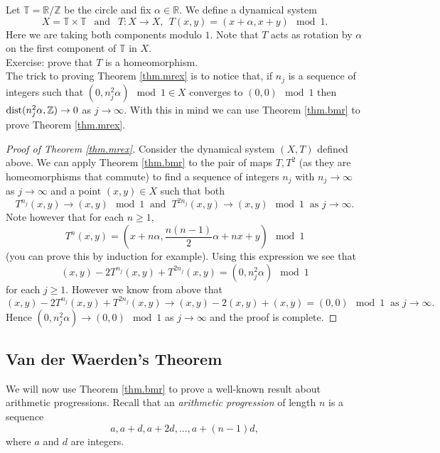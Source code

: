 \documentclass[12pt]{article}
\theoremstyle{definition}
\theoremstyle{remark}
\begin{document}
Let $\mathbb T = \mathbb R/ \mathbb Z$ be the circle and fix $\alpha \in \mathbb{R}$. We define a dynamical system
\[
X = \mathbb T \times \mathbb T \ \ \text{ and } \ \ T: X \to X, \ \ T(x,y) = (x + \alpha, x + y) \mod 1.
\]
Here we are taking both components modulo $1$. Note that $T$ acts as rotation by $\alpha$ on the first component of $\mathbb T$ in $X$. \\

Exercise: prove that $T$ is a homeomorphism.\\

The trick to proving Theorem \ref{thm.mrex} is to notice that, if $n_j$ is a sequence of integers such that $(0,n_j^2\alpha) \mod 1 \in X$ converges to $(0,0) \mod 1$  then $\textnormal{dist}(n_j^2\alpha, \mathbb{Z}) \to 0 $ as $j \to\infty$. With this in mind we can use Theorem \ref{thm.bmr} to prove Theorem \ref{thm.mrex}.

\begin{proof}[Proof of Theorem \ref{thm.mrex}]
Consider the dynamical system $(X,T)$ defined above. We can apply Theorem \ref{thm.bmr} to the pair of maps $T, T^2$ (as they are homeomorphisms that commute) to find a sequence of integers $n_j$ with $n_j \to \infty$ as $j\to\infty$ and a point $(x,y) \in X$ such that both
\[
T^{n_j}(x,y) \to (x,y) \mod 1 \ \text{ and } \ T^{2n_j}(x,y) \to (x,y) \mod 1\ \text{ as $j\to\infty$.}
\]
Note however that for each $n \ge 1$,
\[
T^n(x,y) = \left(x+n\alpha, \frac{n(n-1)}{2}\alpha + nx + y\right) \mod 1
\]
(you can prove this by induction for example). Using this expression we see that
\[
(x,y) - 2T^{n_j}(x,y) + T^{2n_j}(x,y) = (0, n_j^2 \alpha) \mod 1
\]
for each $j \ge 1$. However we know from above that
\[
(x,y) - 2T^{n_j}(x,y) + T^{2n_j}(x,y)  \to (x,y) - 2(x,y) + (x,y) = (0,0) \mod 1 \ \text{ as $j\to\infty$.}
\]
Hence $(0, n_j^2 \alpha) \to (0,0) \mod 1$ as $j \to \infty$ and the proof is complete.
\end{proof}




\subsection{Van der Waerden's Theorem}
We will now use Theorem \ref{thm.bmr} to prove a well-known result about arithmetic progressions.
\medskip
Recall that an {\it arithmetic progression} of length $n$ is a sequence
\[
a, a+d,a+2d,\ldots,a+(n-1)d,
\]
where $a$ and $d$ are integers.
\end{document}
